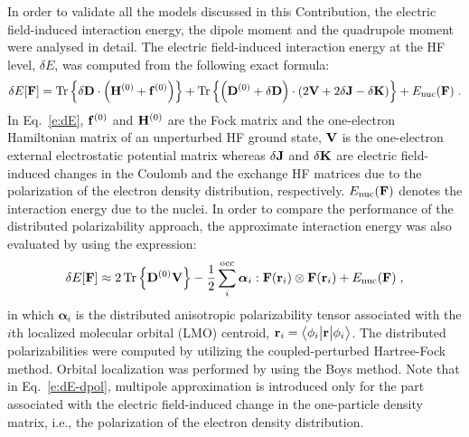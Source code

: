 \documentclass[aip,graphicx]{revtex4-1}
\newcommand{\tbraket}[3]{\ensuremath{\bigl\langle {#1} \bigl\lvert {#2} \bigl\lvert {#3} \bigr\rangle}}
\newcommand{\BM}[1]{\bm{#1}}
\DeclareMathOperator{\Tr}{Tr}
\begin{document}
In order to validate all the models discussed in this Contribution,
the electric field\hyp{}induced interaction energy, 
the dipole moment and the quadrupole moment were analysed in detail.
The electric field\hyp{}induced interaction energy at the HF level, $\delta E$,
was computed from the following exact formula:
%
\begin{multline}\label{e:dE}
 \delta E[{\bf F}] = 
                     \Tr{\left\{ \delta {\bf D} \cdot
                                \left( {\bf H}^{(0)} + {\bf f}^{(0)} \right) \right\}}
                   + \Tr{\left\{ \left( {\bf D}^{(0)} + \delta {\bf D} \right) \cdot
                                \left( 2{\bf V} + 2\delta {\bf J} - \delta {\bf K}\right) \right\}} 
                   + E_{\rm nuc}({\bf F}) \;.
\end{multline}
%
In Eq.~\eqref{e:dE}, ${\bf f}^{(0)}$ and ${\bf H}^{(0)}$ are the Fock matrix and 
the one\hyp{}electron Hamiltonian matrix of an unperturbed HF ground state,
${\bf V}$ is the one\hyp{}electron external electrostatic potential matrix whereas $\delta {\bf J}$
and $\delta {\bf K}$ are electric field\hyp{}induced changes in the Coulomb and the exchange HF matrices due to 
the polarization of the electron density distribution, respectively. $E_{\rm nuc}({\bf F})$ denotes the interaction energy
due to the nuclei.
In order to compare the performance of the distributed polarizability approach,
the approximate interaction energy was also evaluated by using the expression:
%
\begin{equation}\label{e:dE-dpol}
 \delta E[{\bf F}] \approx 2 \Tr{\left\{ {\bf D}^{(0)} {\bf V}\right\} } 
                   - \frac{1}{2} \sum_i^{\rm occ} {\BM \alpha}_i : {\bf F}({\bf r}_i) \otimes {\bf F}({\bf r}_i)
                   + E_{\rm nuc}({\bf F}) \;,
\end{equation}
%
in which ${\BM \alpha}_i$ is the distributed anisotropic polarizability tensor associated with the
$i$th localized molecular orbital (LMO) centroid, ${\bf r}_i = \tbraket{\phi_i}{\bf r}{\phi_i}$.
The distributed polarizabilities were computed by utilizing the coupled\hyp{}perturbed Hartree\hyp{}Fock
method. Orbital localization was performed by using the Boys method. Note that in Eq.~\eqref{e:dE-dpol}, 
multipole approximation is introduced only for the part associated with the electric field\hyp{}induced
change in the one\hyp{}particle density matrix, i.e., the polarization of the electron density distribution.
\end{document}
